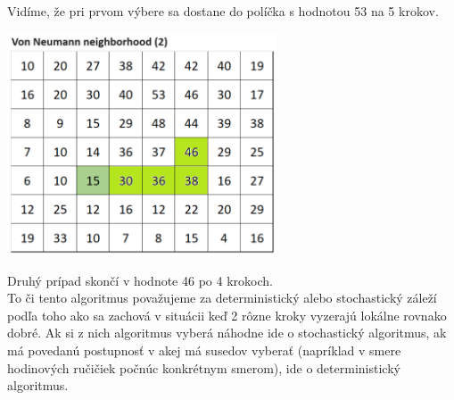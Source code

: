 \documentclass[a4paper]{article}
\begin{document}
Vidíme, že pri prvom výbere sa dostane do políčka s hodnotou 53 na 5 krokov.

\centerline{\includegraphics[width=0.6\textwidth]{von_2}} 

Druhý prípad skončí v hodnote 46 po 4 krokoch.
\\

To či tento algoritmus považujeme za deterministický alebo stochastický záleží podľa toho ako sa zachová v situácii keď 2 rôzne kroky vyzerajú lokálne rovnako dobré. Ak si z nich algoritmus vyberá náhodne ide o stochastický algoritmus, ak má povedanú postupnosť v akej má susedov vyberať (napríklad v smere hodinových ručičiek počnúc konkrétnym smerom), ide o deterministický algoritmus. 
\end{document}
